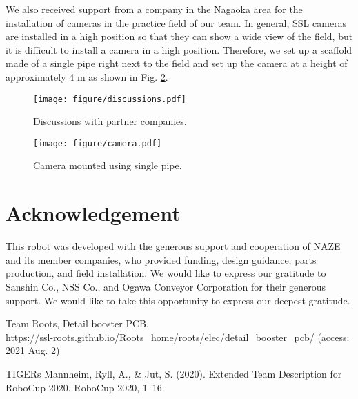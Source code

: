 \documentclass[]{llncs}
\begin{document}
We also received support from a company in the Nagaoka area for the installation of cameras in the practice field of our team.
%
In general, SSL cameras are installed in a high position so that they can show a wide view of the field, but it is difficult to install a camera in a high position.
%
Therefore, we set up a scaffold made of a single pipe right next to the field and set up the camera at a height of approximately 4 m as shown in Fig. \ref{fig:camera}.
%
\begin{figure}[ttbp]
    \centering
    \texttt{[image: figure/discussions.pdf]}
    \caption{Discussions with partner companies.}
    \label{fig:discussion}
\end{figure}
%
\begin{figure}[ttbp]
    \centering
    \texttt{[image: figure/camera.pdf]}
    \caption{Camera mounted using single pipe.}
    \label{fig:camera}
\end{figure}

\section{Acknowledgement}
%
This robot was developed with the generous support and cooperation of NAZE and its member companies, who provided funding, design guidance, parts production, and field installation.
%
We would like to express our gratitude to Sanshin Co., NSS Co., and Ogawa Conveyor Corporation for their generous support.
%
We would like to take this opportunity to express our deepest gratitude.


%
%
%
% 
% 
%
\begin{thebibliography}{99}

 Team Roots, Detail booster PCB. \\
\url{https://ssl-roots.github.io/Roots\_home/roots/elec/detail\_booster\_pcb/} (access: 2021 Aug. 2)

TIGERs Mannheim, Ryll, A., \& Jut, S. (2020). Extended Team Description for RoboCup 2020. RoboCup 2020, 1--16.


\end{thebibliography}
\end{document}
